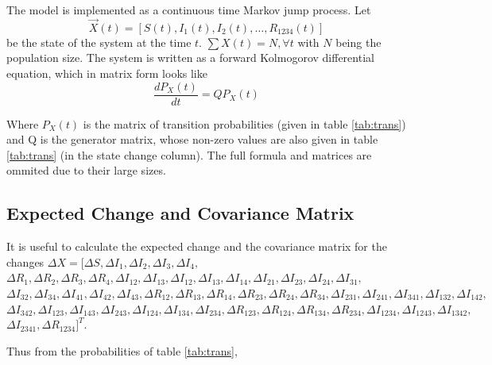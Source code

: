 \documentclass[12pt]{article}
\begin{document}
The model is implemented as a continuous time Markov jump process. Let
$$\overrightarrow{X}(t) = [S(t), I_1(t), I_2(t), \ldots, R_{1234}(t)]$$ 
be the 
state of the system at the time $t$. $\sum X(t) = N, \forall t$ with $N$ being 
the population size. 
The system is written as a forward Kolmogorov differential equation, which in 
matrix form looks like
\begin{equation}
\frac{dP_X(t)}{dt} = Q P_X(t) 
\end{equation}

Where $P_X(t)$ is  the matrix of transition probabilities (given in table 
\ref{tab:trans}) and Q is the generator matrix, whose non-zero values are also 
given in table \ref{tab:trans} (in the state change column). The full formula 
and matrices are ommited due to their large sizes.

\subsection*{Expected Change and Covariance Matrix}

It is useful to calculate the expected change and the covariance matrix for the 
changes $\Delta X = [\Delta S, \Delta I_1, \Delta I_2, \Delta I_3, \Delta I_4,$
$\Delta R_1, \Delta R_2, \Delta R_3, \Delta R_4,\Delta I_{12}, \Delta I_{13},
\Delta I_{12}, \Delta I_{13}, 
\Delta I_{14}, \Delta I_{21}, \Delta I_{23}, \Delta I_{24}, \Delta I_{31},$
$\Delta I_{32}, 
\Delta I_{34}, \Delta I_{41}, \Delta I_{42}, \Delta I_{43}, \Delta R_{12}, 
\Delta R_{13}, \Delta R_{14}, \Delta R_{23}, \Delta R_{24}, \Delta R_{34},
\Delta I_{231}, \Delta I_{241}, \Delta I_{341}, \Delta I_{132}, \Delta I_{142},$
$\Delta I_{342}, \Delta I_{123}, \Delta I_{143}, \Delta I_{243}, \Delta I_{124},
\Delta I_{134}, \Delta I_{234}, \Delta R_{123}, \Delta R_{124}, \Delta R_{134},
\Delta R_{234}, \Delta I_{1234}, \Delta I_{1243}, \Delta I_{1342},$\\
$\Delta I_{2341},\Delta R_{1234}]^T$.


Thus from the probabilities of table \ref{tab:trans},
\end{document}
